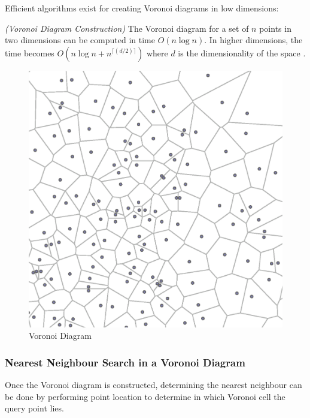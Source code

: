 \documentclass[mcs]{scsthesis}
\begin{document}
Efficient algorithms exist for creating Voronoi diagrams in low dimensions:

\begin{thm} \emph{(Voronoi Diagram Construction)}
The Voronoi diagram for a set of $n$ points in two dimensions can be computed
in time \(O(n \log n)\). In higher dimensions, the time becomes
\(O(n \log n + n^{\lceil(d/2)\rceil})\) where $d$ is the dimensionality of the
space \cite{dutch}.
\end{thm}

\begin{figure}
\begin{center}
\includegraphics[scale=0.5]{diagrams/voronoi.eps}
\caption{Voronoi Diagram}
\label{fig:voronoi_diagram}
\end{center}
\end{figure}

\subsubsection{Nearest Neighbour Search in a Voronoi Diagram}

Once the Voronoi diagram is constructed, determining the nearest neighbour can
be done by performing point location to determine in which Voronoi cell the
query point lies.
\end{document}
